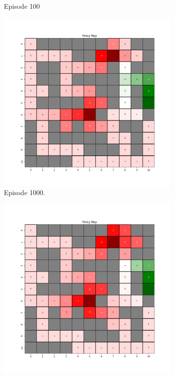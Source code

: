 \documentclass{assignment}
\begin{document}
\begin{figure}[H]
\begin{subfigure}{0.3\textwidth}
    \caption{Episode 100}
    \end{subfigure}
    \begin{subfigure}{0.3\textwidth}
        \includegraphics[width=\textwidth]{figures/policy_td/epsilon_sweep/policy_alpha_0.1_gamma_0.95_epsilon_0.8_iteration_1000.png}
    \caption{Episode 1000.}
    \end{subfigure}\hfill
    \begin{subfigure}{0.3\textwidth}
        \includegraphics[width=\textwidth]{figures/policy_td/epsilon_sweep/policy_alpha_0.1_gamma_0.95_epsilon_0.8_iteration_5000.png}

\end{subfigure}
\end{figure}
\end{document}
